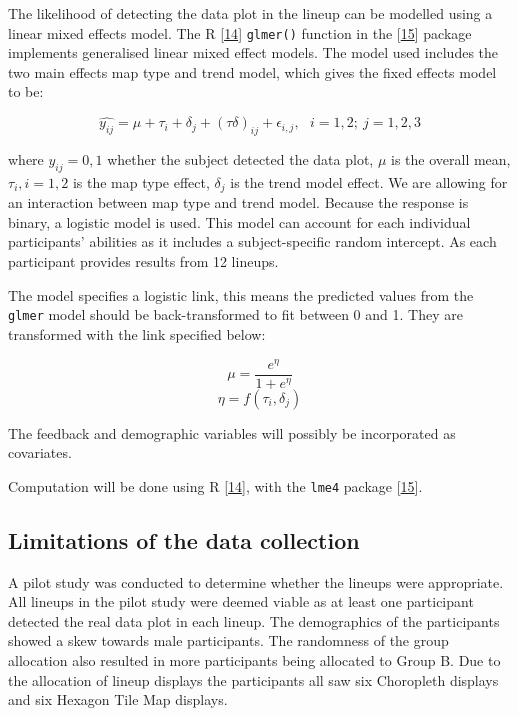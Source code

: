 \documentclass[conference,final,]{IEEEtran}
\begin{document}
The likelihood of detecting the data plot in the lineup can be modelled using a linear mixed effects model.
The R {[}\protect\hyperlink{ref-RCore}{14}{]} \texttt{glmer()} function in the {[}\protect\hyperlink{ref-lme4}{15}{]} package implements generalised linear mixed effect models. The model used includes the two main effects map type and trend model, which gives the fixed effects model to be:

\[\widehat{y_{ij}} = \mu + \tau_i + \delta_j + (\tau\delta)_{ij} + \epsilon_{i,j}, ~~~ i=1,2; ~j=1,2,3\]

where \(y_{ij} = 0, 1\) whether the subject detected the data plot, \(\mu\) is the overall mean, \(\tau_i, i=1,2\) is the map type effect, \(\delta_j\) is the trend model effect. We are allowing for an interaction between map type and trend model. Because the response is binary, a logistic model is used. This model can account for each individual participants' abilities as it includes a subject-specific random intercept. As each participant provides results from 12 lineups.

The model specifies a logistic link, this means the predicted values from the \texttt{glmer} model should be back-transformed to fit between 0 and 1. They are transformed with the link specified below:

\[\mu = \frac{e^{\eta}}{1 + e^{\eta}}\] \label{eq:transform}
\[\eta = f(\tau_i,\delta_j)\]

The feedback and demographic variables will possibly be incorporated as covariates.

Computation will be done using R {[}\protect\hyperlink{ref-RCore}{14}{]}, with the \texttt{lme4} package {[}\protect\hyperlink{ref-lme4}{15}{]}.

\hypertarget{limitations-of-the-data-collection}{%
\subsection{Limitations of the data collection}\label{limitations-of-the-data-collection}}

A pilot study was conducted to determine whether the lineups were appropriate. All lineups in the pilot study were deemed viable as at least one participant detected the real data plot in each lineup.
The demographics of the participants showed a skew towards male participants.
The randomness of the group allocation also resulted in more participants being allocated to Group B. Due to the allocation of lineup displays the participants all saw six Choropleth displays and six Hexagon Tile Map displays.
\end{document}
